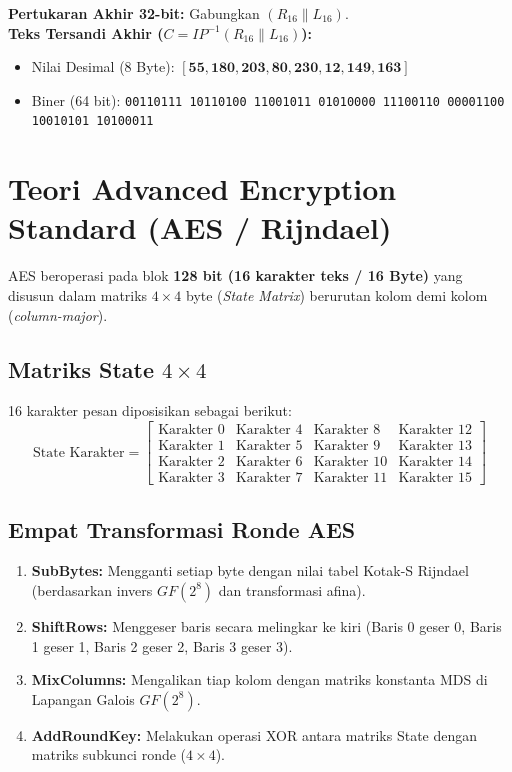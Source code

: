 \documentclass[11pt,a4paper]{article}
\begin{document}
\textbf{Pertukaran Akhir 32-bit:} Gabungkan $(R_{16} \parallel L_{16})$.\\
\textbf{Teks Tersandi Akhir ($C = IP^{-1}(R_{16} \parallel L_{16})$):}
\begin{itemize}[leftmargin=*]
    \item Nilai Desimal (8 Byte): $\mathbf{[55, 180, 203, 80, 230, 12, 149, 163]}$
    \item Biner (64 bit): \texttt{00110111 10110100 11001011 01010000 11100110 00001100 10010101 10100011}
\end{itemize}

\newpage
\section{Teori Advanced Encryption Standard (AES / Rijndael)}

AES beroperasi pada blok \textbf{128 bit (16 karakter teks / 16 Byte)} yang disusun dalam matriks $4 \times 4$ byte (\textit{State Matrix}) berurutan kolom demi kolom (\textit{column-major}).

\subsection{Matriks State $4 \times 4$}
16 karakter pesan diposisikan sebagai berikut:
\begin{equation}
\text{State Karakter} = \begin{bmatrix}
\text{Karakter 0} & \text{Karakter 4} & \text{Karakter 8}  & \text{Karakter 12} \\
\text{Karakter 1} & \text{Karakter 5} & \text{Karakter 9}  & \text{Karakter 13} \\
\text{Karakter 2} & \text{Karakter 6} & \text{Karakter 10} & \text{Karakter 14} \\
\text{Karakter 3} & \text{Karakter 7} & \text{Karakter 11} & \text{Karakter 15}
\end{bmatrix}
\end{equation}

\subsection{Empat Transformasi Ronde AES}
\begin{enumerate}[leftmargin=*]
    \item \textbf{SubBytes:} Mengganti setiap byte dengan nilai tabel Kotak-S Rijndael (berdasarkan invers $GF(2^8)$ dan transformasi afina).
    \item \textbf{ShiftRows:} Menggeser baris secara melingkar ke kiri (Baris 0 geser 0, Baris 1 geser 1, Baris 2 geser 2, Baris 3 geser 3).
    \item \textbf{MixColumns:} Mengalikan tiap kolom dengan matriks konstanta MDS di Lapangan Galois $GF(2^8)$.
    \item \textbf{AddRoundKey:} Melakukan operasi XOR antara matriks State dengan matriks subkunci ronde ($4 \times 4$).
\end{enumerate}
\end{document}

